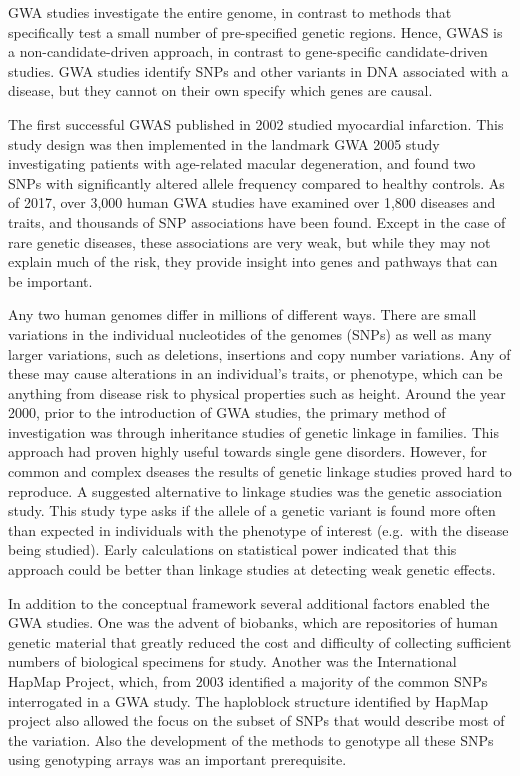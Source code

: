 GWA studies investigate the entire genome, in contrast to methods that specifically test a small number of pre-specified genetic regions. Hence, GWAS is a non-candidate-driven approach, in contrast to gene-specific candidate-driven studies. GWA studies identify SNPs and other variants in DNA associated with a disease, but they cannot on their own specify which genes are causal.

The first successful GWAS published in 2002 studied myocardial infarction. This study design was then implemented in the landmark GWA 2005 study investigating patients with age-related macular degeneration, and found two SNPs with significantly altered allele frequency compared to healthy controls. As of 2017, over 3,000 human GWA studies have examined over 1,800 diseases and traits, and thousands of SNP associations have been found. Except in the case of rare genetic diseases, these associations are very weak, but while they may not explain much of the risk, they provide insight into genes and pathways that can be important.

Any two human genomes differ in millions of different ways. There are small variations in the individual nucleotides of the genomes (SNPs) as well as many larger variations, such as deletions, insertions and copy number variations. Any of these may cause alterations in an individual's traits, or phenotype, which can be anything from disease risk to physical properties such as height. Around the year 2000, prior to the introduction of GWA studies, the primary method of investigation was through inheritance studies of genetic linkage in families. This approach had proven highly useful towards single gene disorders. However, for common and complex dseases the results of genetic linkage studies proved hard to reproduce. A suggested alternative to linkage studies was the genetic association study. This study type asks if the allele of a genetic variant is found more often than expected in individuals with the phenotype of interest (e.g.~with the disease being studied). Early calculations on statistical power indicated that this approach could be better than linkage studies at detecting weak genetic effects.

In addition to the conceptual framework several additional factors enabled the GWA studies. One was the advent of biobanks, which are repositories of human genetic material that greatly reduced the cost and difficulty of collecting sufficient numbers of biological specimens for study. Another was the International HapMap Project, which, from 2003 identified a majority of the common SNPs interrogated in a GWA study. The haploblock structure identified by HapMap project also allowed the focus on the subset of SNPs that would describe most of the variation. Also the development of the methods to genotype all these SNPs using genotyping arrays was an important prerequisite.

